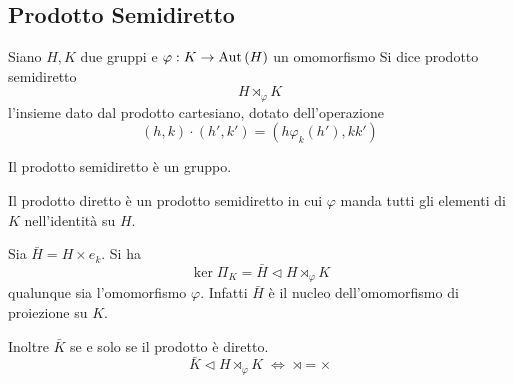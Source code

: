 \subsection{Prodotto Semidiretto}
\begin{multicols}{2}
	\begin{definition}
		Siano $ H, K $ due gruppi e $ \varphi: K \rightarrow \mathrm{Aut}\left( H \right) $ un omomorfismo Si dice prodotto semidiretto
		\[ H \rtimes_\varphi K \]
		l'insieme dato dal prodotto cartesiano, dotato dell'operazione
		\[ (h, k) \cdot (h', k') = (h \varphi_k(h'), kk') \]
	\end{definition}

\begin{remark}
	Il prodotto semidiretto è un gruppo.
\end{remark}
\begin{remark}
	Il prodotto diretto è un prodotto semidiretto in cui $ \varphi $ manda tutti gli elementi di $ K $ nell'identità su $ H $.
\end{remark}
\begin{remark}
	Sia $ \bar{H} = H \times {e_k} $. Si ha $$  \ker\Pi_K =  \bar{H} \lhd H \rtimes_\varphi K  $$ qualunque sia l'omomorfismo $ \varphi$. Infatti $ \bar{H} $ è il nucleo dell'omomorfismo di proiezione su $ K $.
\end{remark}
\begin{remark}
	Inoltre $ \bar{K}$ se e solo se il prodotto è diretto. $$  \bar{K} \lhd H \rtimes_\varphi K  \;\Leftrightarrow\; \rtimes = \times $$
\end{remark}


\end{multicols}
